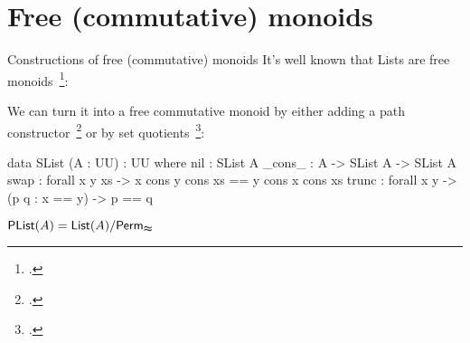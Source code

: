 \documentclass[9pt]{beamer}
\begin{document}
\section{Free (commutative) monoids}

\begin{frame}[fragile]{Constructions of free (commutative) monoids}
    It's well known that Lists are free monoids~\footcite{dubucFreeMonoids1974,kellyUnifiedTreatmentTransfinite1980}:


    We can turn it into a free commutative monoid by either adding a path
    constructor~\footcite{choudhuryFreeCommutativeMonoids2023} or
    by set quotients~\footcite{joramConstructiveFinalSemantics2023}:

    \begin{dblock}
        \begin{code}
data SList (A : UU) : UU where
  nil : SList A
  _cons_ : A -> SList A -> SList A
  swap : forall x y xs -> x cons y cons xs == y cons x cons xs 
  trunc : forall x y -> (p q : x == y) -> p == q
        \end{code}
    \end{dblock}

    \begin{dblock}
        $\mathsf{PList}(A) = \mathsf{List}(A) / \mathsf{Perm}_{\mathrel{\boldsymbol{\approx}}}$
    \end{dblock}
    
    

    
\end{frame}
\end{document}
